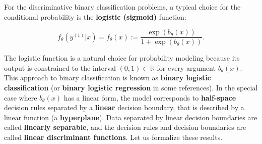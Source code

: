 \documentclass{report}
\begin{document}
For the discriminative binary classification problems, a typical choice for the conditional probability is the \textbf{logistic (sigmoid)} function:

\begin{equation}
f_\theta(y^{(1)}|x) = f_\theta(x) := \frac{\exp (b_\theta(x))}{1+\exp (b_\theta(x))}.
\end{equation}

The logistic function is a natural choice for probability modeling because its output is constrained to the interval $(0, 1) \subset \mathbb{R}$ for every argument $b_\theta(x)$. This approach to binary classification is known as \textbf{binary logistic classification} (or \textbf{binary logistic regression} in some references). In the special case where $b_\theta(x)$ has a linear form, the model corresponds to \textbf{half-space} decision rules separated by a \textbf{linear} decision boundary, that is described by a linear function (a \textbf{hyperplane}). Data separated by linear decision boundaries are called \textbf{linearly separable}, and the decision rules and decision boundaries are called \textbf{linear discriminant functions}. Let us formalize these results.
\end{document}
